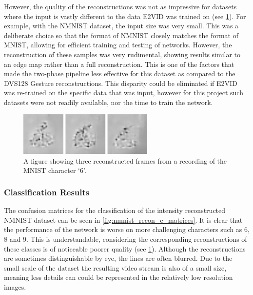However, the quality of the reconstructions was not as impressive for datasets where the input is vastly different to the data E2VID was trained on (see \cref{fig:nmnist_reconstructions}). For example, with the NMNIST dataset\cite{NMNIST}, the input size was very small. This was a deliberate choice so that the format of NMNIST closely matches the format of MNIST, allowing for efficient training and testing of networks. However, the reconstruction of these samples was very rudimental, showing results similar to an edge map rather than a full reconstruction. This is one of the factors that made the two-phase pipeline less effective for this dataset as compared to the DVS128 Gesture reconstructions. This disparity could be eliminated if E2VID was re-trained on the specific data that was input, however for this project such datasets were not readily available, nor the time to train the network.

\begin{figure}[htb]%
    \centering
    \includegraphics[width=0.6\textwidth]{testingandresults/images/nmnist_reconstructions.png}
    \caption{A figure showing three reconstructed frames from a recording of the MNIST character `6'.}%
    \label{fig:nmnist_reconstructions}%
\end{figure}

\subsubsection{Classification Results}

The confusion matrices for the classification of the intensity reconstructed NMNIST dataset can be seen in \cref{fig:nmnist_recon_c_matrices}. It is clear that the performance of the network is worse on more challenging characters such as 6, 8 and 9. This is understandable, considering the corresponding reconstructions of these classes is of noticeable poorer quality (see \cref{fig:nmnist_reconstructions}). Although the reconstructions are sometimes distinguishable by eye, the lines are often blurred. Due to the small scale of the dataset the resulting video stream is also of a small size, meaning less details can could be represented in the relatively low resolution images.

